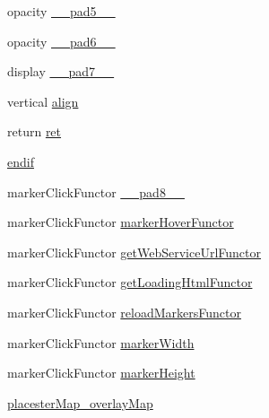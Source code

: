 \begin{DoxyCompactItemize}
\item 
opacity \hyperlink{listings__map_8php_aa6b385de9b816c43892787e4b74c6f46}{\_\-\_\-pad5\_\-\_\-}
\item 
opacity \hyperlink{listings__map_8php_af4b5cf450fa285756c93d9a01be423a7}{\_\-\_\-pad6\_\-\_\-}
\item 
display \hyperlink{listings__map_8php_a4498aa981c74a39e528325dd26431679}{\_\-\_\-pad7\_\-\_\-}
\item 
vertical \hyperlink{listings__map_8php_a87061853e71984e1c11ad6f01f1035b2}{align}
\item 
return \hyperlink{listings__map_8php_a339672ff94e6199019102f50d317c3d7}{ret}
\item 
\hyperlink{listings__map_8php_a9766b5964b96b85e50bbdf50a4d7bb71}{endif}
\item 
markerClickFunctor \hyperlink{listings__map_8php_aa3366304065e1c423a969e3b6450e228}{\_\-\_\-pad8\_\-\_\-}
\item 
markerClickFunctor \hyperlink{listings__map_8php_aec3bcb63e527a7a52319075085ab21f6}{markerHoverFunctor}
\item 
markerClickFunctor \hyperlink{listings__map_8php_aa25e66469b22a222935e416bff222b2f}{getWebServiceUrlFunctor}
\item 
markerClickFunctor \hyperlink{listings__map_8php_a54485ce94b255dcb3cd7d3732ada64d1}{getLoadingHtmlFunctor}
\item 
markerClickFunctor \hyperlink{listings__map_8php_a5c2973f135c0d639b88938783dcededf}{reloadMarkersFunctor}
\item 
markerClickFunctor \hyperlink{listings__map_8php_ac41fa005dafe52a3a4d4311530f3b0b0}{markerWidth}
\item 
markerClickFunctor \hyperlink{listings__map_8php_a4773e3130e4ae98ae376b51fc0c702fa}{markerHeight}
\item 
\hyperlink{listings__map_8php_a8c0f29b502140312a60d863874ac03f1}{placesterMap\_\-overlayMap}
\end{DoxyCompactItemize}


